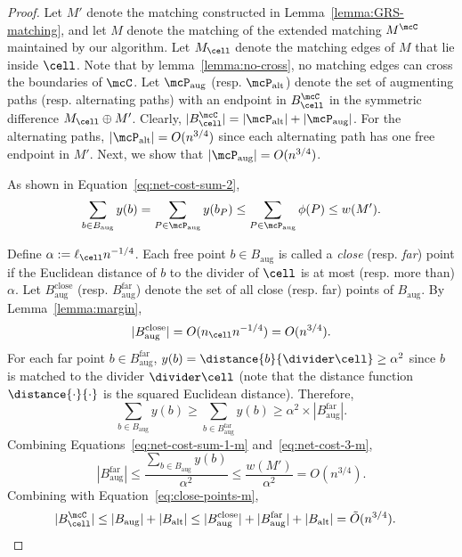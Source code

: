 \GRSIters*
\begin{proof}
Let $M'$ denote the matching constructed in Lemma~\ref{lemma:GRS-matching}, and let $M$ denote the matching of the extended matching $M^\mcC$ maintained by our algorithm. Let $M_\cell$ denote the matching edges of $M$ that lie inside $\cell$. Note that by lemma~\ref{lemma:no-cross}, no matching edges can cross the boundaries of $\mcC$.
Let $\mcP_{\mathrm{aug}}$ (resp. $\mcP_{\mathrm{alt}}$) denote the set of augmenting paths (resp. alternating paths) with an endpoint in $B_\cell^\mcC$ in the symmetric difference $M_\cell\oplus M'$. Clearly, $|B_\cell^\mcC|=|\mcP_{\mathrm{alt}}| + |\mcP_{\mathrm{aug}}|$. For the alternating paths, $|\mcP_{\mathrm{alt}}|=O(n^{3/4})$ since each alternating path has one free endpoint in $M'$. 
Next, we show that $|\mcP_{\mathrm{aug}}|=O(n^{3/4})$.

As shown in Equation~\eqref{eq:net-cost-sum-2},
\begin{align}
    \sum_{b\in B_{\mathrm{aug}}} y(b) = \sum_{P\in \mcP_{\mathrm{aug}}} y(b_P)\le \sum_{P\in \mcP_{\mathrm{aug}}} \phi(P) \le w(M').\label{eq:net-cost-sum-1-m}
\end{align}

Define $\alpha:=\ell_\cell n^{-1/4}$. Each free point $b\in B_{\mathrm{aug}}$ is called a \emph{close} (resp. \emph{far}) point if the Euclidean distance of $b$ to the divider of $\cell$ is at most (resp. more than) $\alpha$. Let $B_{\mathrm{aug}}^{\mathrm{close}}$ (resp. $B_{\mathrm{aug}}^{\mathrm{far}}$) denote the set of all close (resp. far) points of $B_{\mathrm{aug}}$. By Lemma~\ref{lemma:margin},
\begin{equation}\label{eq:close-points-m}
    |B_{\mathrm{aug}}^{\mathrm{close}}| = O(n_\cell n^{-1/4}) = O(n^{3/4}).
\end{equation}
For each far point $b\in B_{\mathrm{aug}}^{\mathrm{far}}$, $y(b)=\distance{b}{\divider\cell}\ge \alpha^2$ since $b$ is matched to the divider $\divider\cell$ (note that the distance function $\distance{\cdot}{\cdot}$ is the squared Euclidean distance). Therefore, 
\begin{equation}\label{eq:net-cost-3-m}
    \sum_{b\in B_{\mathrm{aug}}} y(b) \ge \sum_{b\in B_{\mathrm{aug}}^{\mathrm{far}}} y(b) \ge \alpha^2\times |B_{\mathrm{aug}}^{\mathrm{far}}|.
\end{equation}
Combining Equations~\eqref{eq:net-cost-sum-1-m} and~\eqref{eq:net-cost-3-m},
\begin{equation}\label{eq:far-points-m}
    |B_{\mathrm{aug}}^{\mathrm{far}}| \le \frac{\sum_{b\in B_{\mathrm{aug}}} y(b)}{\alpha^2} \le \frac{w(M')}{\alpha^2} = O(n^{3/4}).
\end{equation}
Combining with Equation~\eqref{eq:close-points-m},
\begin{align*}
    |B_\cell^\mcC| &\le |B_{\mathrm{aug}}| + |B_{\mathrm{alt}}| \le |B_{\mathrm{aug}}^{\mathrm{close}}| + |B_{\mathrm{aug}}^{\mathrm{far}}| + |B_{\mathrm{alt}}| = \tilde{O}(n^{3/4}).
\end{align*}
\end{proof}





